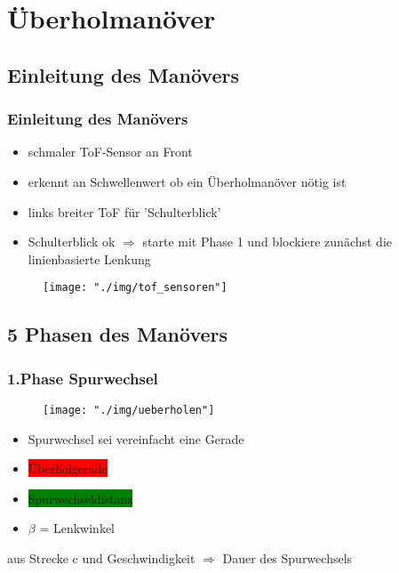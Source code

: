 \documentclass{beamer}
\begin{document}
	\section{Überholmanöver}
	
	\subsection{Einleitung des Manövers}
	
	\begin{frame}
		\frametitle{Einleitung des Manövers}
		\begin{itemize}
			\item schmaler ToF-Sensor an Front
			\item erkennt an Schwellenwert ob ein Überholmanöver nötig ist
			\item links breiter ToF für 'Schulterblick'
			\item Schulterblick ok $\Rightarrow$ starte mit Phase 1 und blockiere zunächst die linienbasierte Lenkung
		\end{itemize}
		\begin{center}
			\begin{figure}[h]
				\texttt{[image: "./img/tof\_sensoren"]}
				\label{fig:topdown}
			\end{figure}
		\end{center}
	\end{frame}
	
	\subsection{5 Phasen des Manövers}
	
	\begin{frame}
		\frametitle{1.Phase Spurwechsel}
		\begin{center}
			\begin{figure}[h]
				\texttt{[image: "./img/ueberholen"]}
				\label{fig:topdown}
			\end{figure}
		\end{center}
		\begin{itemize}
			\item Spurwechsel sei vereinfacht eine Gerade
			\item \colorbox{red}{Überholgerade}
			\item \colorbox{green}{Spurwechseldistanz}
			\item $\beta$ = Lenkwinkel
		\end{itemize}
		aus Strecke c und Geschwindigkeit $\Rightarrow$  Dauer des Spurwechsels
	\end{frame}
	
\end{document}
